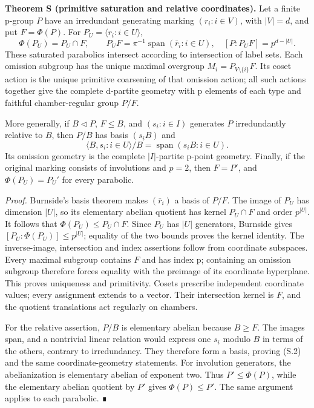 \documentclass[
  10pt,
  letterpaper,
]{article}
\begin{document}
\textbf{Theorem S (primitive saturation and relative coordinates).} Let
a finite p-group \(P\) have an irredundant generating marking
\((r_i:i\in V)\), with \(|V|=d\), and put \(F=\Phi(P)\). For
\(P_U=\langle r_i:i\in U\rangle\), \[
 \Phi(P_U)=P_U\cap F,\qquad
 P_UF=\pi^{-1}\operatorname{span}(\bar r_i:i\in U),
 \quad [P:P_UF]=p^{d-|U|}.                           \tag{S.1}
\] These saturated parabolics intersect according to intersection of
label sets. Each omission subgroup has the unique maximal overgroup
\(M_i=P_{V\setminus\{i\}}F\). Its coset action is the unique primitive
coarsening of that omission action; all such actions together give the
complete d-partite geometry with p elements of each type and faithful
chamber-regular group \(P/F\).

More generally, if \(B\lhd P\), \(F\le B\), and \((s_i:i\in I)\)
generates \(P\) irredundantly relative to \(B\), then \(P/B\) has basis
\((s_iB)\) and \[
 \langle B,s_i:i\in U\rangle/B
      =\operatorname{span}(s_iB:i\in U).                \tag{S.2}
\] Its omission geometry is the complete \(|I|\)-partite p-point
geometry. Finally, if the original marking consists of involutions and
\(p=2\), then \(F=P'\), and \(\Phi(P_U)=P_U'\) for every parabolic.

\emph{Proof.} Burnside's basis theorem makes \((\bar r_i)\) a basis of
\(P/F\). The image of \(P_U\) has dimension \(|U|\), so its elementary
abelian quotient has kernel \(P_U\cap F\) and order \(p^{|U|}\). It
follows that \(\Phi(P_U)\le P_U\cap F\). Since \(P_U\) has \(|U|\)
generators, Burnside gives \([P_U:\Phi(P_U)]\le p^{|U|}\); equality of
the two bounds proves the kernel identity. The inverse-image,
intersection and index assertions follow from coordinate subspaces.
Every maximal subgroup contains \(F\) and has index p; containing an
omission subgroup therefore forces equality with the preimage of its
coordinate hyperplane. This proves uniqueness and primitivity. Cosets
prescribe independent coordinate values; every assignment extends to a
vector. Their intersection kernel is \(F\), and the quotient
translations act regularly on chambers.

For the relative assertion, \(P/B\) is elementary abelian because
\(B\ge F\). The images span, and a nontrivial linear relation would
express one \(s_i\) modulo \(B\) in terms of the others, contrary to
irredundancy. They therefore form a basis, proving (S.2) and the same
coordinate-geometry statements. For involution generators, the
abelianization is elementary abelian of exponent two. Thus
\(P'\le\Phi(P)\), while the elementary abelian quotient by \(P'\) gives
\(\Phi(P)\le P'\). The same argument applies to each parabolic. ∎
\end{document}
